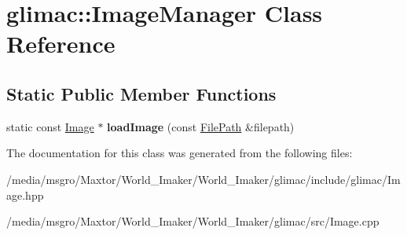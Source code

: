 \hypertarget{classglimac_1_1ImageManager}{}\section{glimac\+:\+:Image\+Manager Class Reference}
\label{classglimac_1_1ImageManager}
\subsection*{Static Public Member Functions}
\begin{DoxyCompactItemize}
\item 
\mbox{\label{classglimac_1_1ImageManager_a491965842042b2ef01eade7136ddb54d}} 
static const \hyperlink{classglimac_1_1Image}{Image} $\ast$ {\bfseries load\+Image} (const \hyperlink{classglimac_1_1FilePath}{File\+Path} \&filepath)
\end{DoxyCompactItemize}


The documentation for this class was generated from the following files\+:\begin{DoxyCompactItemize}
\item 
/media/msgro/\+Maxtor/\+World\+\_\+\+Imaker/\+World\+\_\+\+Imaker/glimac/include/glimac/Image.\+hpp\item 
/media/msgro/\+Maxtor/\+World\+\_\+\+Imaker/\+World\+\_\+\+Imaker/glimac/src/Image.\+cpp\end{DoxyCompactItemize}
